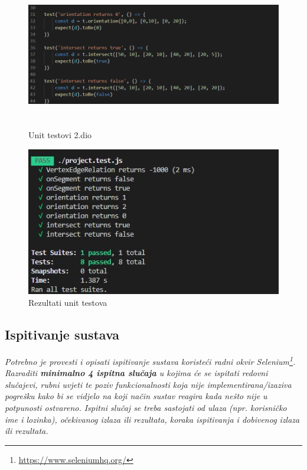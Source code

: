 {			\break
			\begin{figure}[h]
				\centering
				\includegraphics[width=18.5cm,height=6.5cm]{unitTest2}
				\caption{Unit testovi 2.dio}
				\label{fig:ut2}
			\end{figure}
		
		
			\begin{figure}[h]
				\centering
				\includegraphics[width=18.5cm,height=6.5cm]{unitTestResult}
				\caption{Rezultati unit testova}
				\label{fig:ut2}
			\end{figure}
			
			
			\break
			\subsection{Ispitivanje sustava}
			
			 \textit{Potrebno je provesti i opisati ispitivanje sustava koristeći radni okvir Selenium\footnote{\url{https://www.seleniumhq.org/}}. Razraditi \textbf{minimalno 4 ispitna slučaja} u kojima će se ispitati redovni slučajevi, rubni uvjeti te poziv funkcionalnosti koja nije implementirana/izaziva pogrešku kako bi se vidjelo na koji način sustav reagira kada nešto nije u potpunosti ostvareno. Ispitni slučaj se treba sastojati od ulaza (npr. korisničko ime i lozinka), očekivanog izlaza ili rezultata, koraka ispitivanja i dobivenog izlaza ili rezultata.\\ }
			 
}

